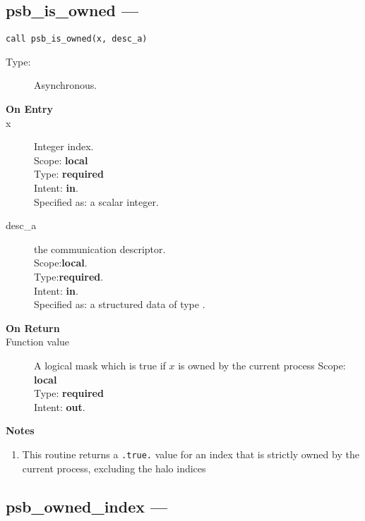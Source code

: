 %
%
\clearpage\subsection{psb\_is\_owned  --- }

\begin{verbatim}
call psb_is_owned(x, desc_a)
\end{verbatim}

\begin{description}
\item[Type:] Asynchronous.
\item[\bf On Entry]
\item[x] Integer index.\\
Scope: {\bf local} \\
Type: {\bf required}\\
Intent: {\bf in}.\\
Specified as: a scalar integer.\\
\item[desc\_a] the communication descriptor.\\
Scope:{\bf local}.\\
Type:{\bf required}.\\
Intent: {\bf in}.\\
Specified as: a structured data of type \descdata.
\end{description}

\begin{description}
\item[\bf On Return]
\item[Function value] A logical mask which is true if 
  $x$ is  owned by the current process
Scope: {\bf local} \\
Type: {\bf required}\\
Intent: {\bf out}.\\
\end{description}


{\par\noindent\large\bfseries Notes}
\begin{enumerate}
\item This routine returns a \verb|.true.| value for an index
  that is strictly owned by the current process, excluding the halo
  indices
\end{enumerate}


\clearpage\subsection{psb\_owned\_index  --- }

